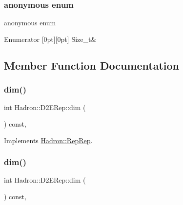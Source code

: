 \subsubsection{\texorpdfstring{anonymous enum}{anonymous enum}}
{\footnotesize\ttfamily anonymous enum}

\begin{DoxyEnumFields}{Enumerator}
[0pt][0pt]{}\mbox{\label{structHadron_1_1D2ERep_ac2794603a26752c7f49eaaa4a0d07198aa7f003f5542c1af092cee55a485251fc}} 
Size\+\_\+t&\\
\hline

\end{DoxyEnumFields}


\subsection{Member Function Documentation}
\mbox{\label{structHadron_1_1D2ERep_acf6c72a31e0813079ddaea61133600e4}} 
\subsubsection{\texorpdfstring{dim()}{dim()}\hspace{0.1cm}{\footnotesize\ttfamily [1/5]}}
{\footnotesize\ttfamily int Hadron\+::\+D2\+E\+Rep\+::dim (\begin{DoxyParamCaption}{ }\end{DoxyParamCaption}) const\hspace{0.3cm}{\ttfamily [inline]}, {\ttfamily [virtual]}}



Implements \mbox{\hyperlink{structHadron_1_1RepRep_a92c8802e5ed7afd7da43ccfd5b7cd92b}{Hadron\+::\+Rep\+Rep}}.

\mbox{\label{structHadron_1_1D2ERep_acf6c72a31e0813079ddaea61133600e4}} 
\subsubsection{\texorpdfstring{dim()}{dim()}\hspace{0.1cm}{\footnotesize\ttfamily [2/5]}}
{\footnotesize\ttfamily int Hadron\+::\+D2\+E\+Rep\+::dim (\begin{DoxyParamCaption}{ }\end{DoxyParamCaption}) const\hspace{0.3cm}{\ttfamily [inline]}, {\ttfamily [virtual]}}



